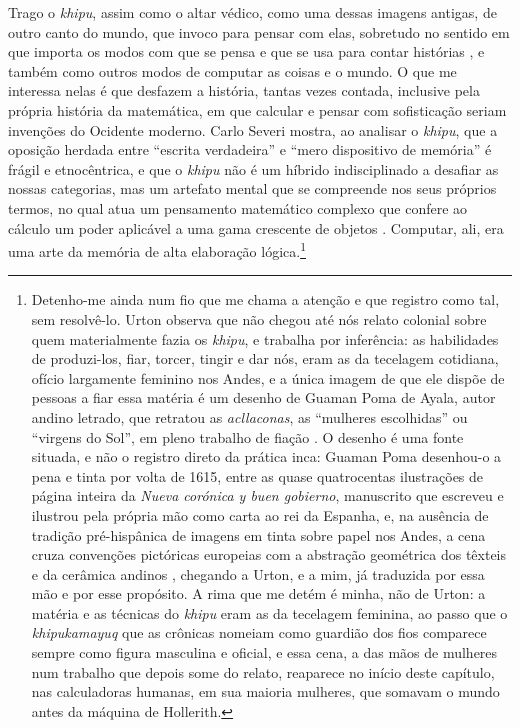 Trago o \textit{khipu}, assim como o altar védico, como uma dessas imagens antigas, de outro canto do mundo, que invoco para pensar com elas, sobretudo no sentido em que importa os modos com que se pensa e que se usa para contar histórias \parencite{Haraway2023Ficar}, e também como outros modos de computar as coisas e o mundo. O que me interessa nelas é que desfazem a história, tantas vezes contada, inclusive pela própria história da matemática, em que calcular e pensar com sofisticação seriam invenções do Ocidente moderno. Carlo Severi mostra, ao analisar o \textit{khipu}, que a oposição herdada entre \enquote{escrita verdadeira} e \enquote{mero dispositivo de memória} é frágil e etnocêntrica, e que o \textit{khipu} não é um híbrido indisciplinado a desafiar as nossas categorias, mas um artefato mental que se compreende nos seus próprios termos, no qual atua um pensamento matemático complexo que confere ao cálculo um poder aplicável a uma gama crescente de objetos \parencite[pp.~66--70, 90--93]{Severi2018Imagination}. Computar, ali, era uma arte da memória de alta elaboração lógica.\footnote{Detenho-me ainda num fio que me chama a atenção e que registro como tal, sem resolvê-lo. Urton observa que não chegou até nós relato colonial sobre quem materialmente fazia os \textit{khipu}, e trabalha por inferência: as habilidades de produzi-los, fiar, torcer, tingir e dar nós, eram as da tecelagem cotidiana, ofício largamente feminino nos Andes, e a única imagem de que ele dispõe de pessoas a fiar essa matéria é um desenho de Guaman Poma de Ayala, autor andino letrado, que retratou as \textit{acllaconas}, as \enquote{mulheres escolhidas} ou \enquote{virgens do Sol}, em pleno trabalho de fiação \parencite[pp.~120--124, fig.~5.3]{urton2003signs}. O desenho é uma fonte situada, e não o registro direto da prática inca: Guaman Poma desenhou-o a pena e tinta por volta de 1615, entre as quase quatrocentas ilustrações de página inteira da \textit{Nueva corónica y buen gobierno}, manuscrito que escreveu e ilustrou pela própria mão como carta ao rei da Espanha, e, na ausência de tradição pré-hispânica de imagens em tinta sobre papel nos Andes, a cena cruza convenções pictóricas europeias com a abstração geométrica dos têxteis e da cerâmica andinos \parencite{Adorno2000Writing}, chegando a Urton, e a mim, já traduzida por essa mão e por esse propósito. A rima que me detém é minha, não de Urton: a matéria e as técnicas do \textit{khipu} eram as da tecelagem feminina, ao passo que o \textit{khipukamayuq} que as crônicas nomeiam como guardião dos fios comparece sempre como figura masculina e oficial, e essa cena, a das mãos de mulheres num trabalho que depois some do relato, reaparece no início deste capítulo, nas calculadoras humanas, em sua maioria mulheres, que somavam o mundo antes da máquina de Hollerith.}


